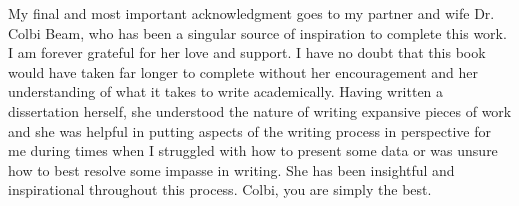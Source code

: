My final and most important acknowledgment goes to my partner and wife Dr. Colbi Beam, who has been a singular source of inspiration to complete this work. I am forever grateful for her love and support. I have no doubt that this book would have taken far longer to complete without her encouragement and her understanding of what it takes to write academically. Having written a dissertation herself, she understood the nature of writing expansive pieces of work and she was helpful in putting aspects of the writing process in perspective for me during times when I struggled with how to present some data or was unsure how to best resolve some impasse in writing. She has been insightful and inspirational throughout this process. Colbi, you are simply the best.